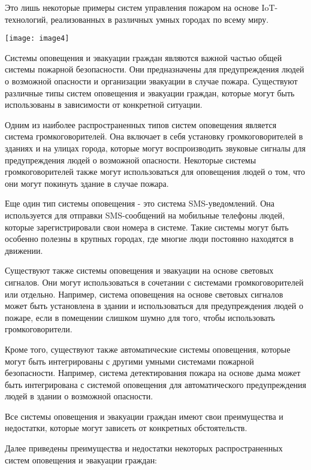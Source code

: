 \begin{multicols}{2}
Это лишь некоторые примеры систем управления пожаром на основе
IoT-технологий, реализованных в различных умных городах по всему миру.

{\centering
  \texttt{[image: image4]}
  }

Системы оповещения и эвакуации граждан являются важной частью общей
системы пожарной безопасности. Они предназначены для предупреждения
людей о возможной опасности и организации эвакуации в случае пожара.
Существуют различные типы систем оповещения и эвакуации граждан, которые
могут быть использованы в зависимости от конкретной ситуации.

Одним из наиболее распространенных типов систем оповещения является
система громкоговорителей. Она включает в себя установку
громкоговорителей в зданиях и на улицах города, которые могут
воспроизводить звуковые сигналы для предупреждения людей о возможной
опасности. Некоторые системы громкоговорителей также могут
использоваться для оповещения людей о том, что они могут покинуть здание
в случае пожара.

Еще один тип системы оповещения - это система SMS-уведомлений. Она
используется для отправки SMS-сообщений на мобильные телефоны людей,
которые зарегистрировали свои номера в системе. Такие системы могут быть
особенно полезны в крупных городах, где многие люди постоянно находятся
в движении.

Существуют также системы оповещения и эвакуации на основе световых
сигналов. Они могут использоваться в сочетании с системами
громкоговорителей или отдельно. Например, система оповещения на основе
световых сигналов может быть установлена в здании и использоваться для
предупреждения людей о пожаре, если в помещении слишком шумно для того,
чтобы использовать громкоговорители.

Кроме того, существуют также автоматические системы оповещения, которые
могут быть интегрированы с другими умными системами пожарной
безопасности. Например, система детектирования пожара на основе дыма
может быть интегрирована с системой оповещения для автоматического
предупреждения людей в здании о возможной опасности.

Все системы оповещения и эвакуации граждан имеют свои преимущества и
недостатки, которые могут зависеть от конкретных обстоятельств.

Далее приведены преимущества и недостатки некоторых распространенных
систем оповещения и эвакуации граждан:


\end{multicols}
